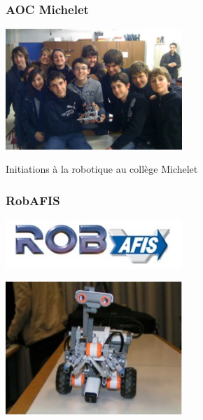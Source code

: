 \documentclass[9pt]{beamer}
\begin{document}
\begin{frame}
	\frametitle{AOC Michelet}
	
	\begin{center}
		\includegraphics[width=0.5\textwidth]{michelet}
		
		Initiations à la robotique au collège Michelet

	\end{center}
	
\end{frame}


\begin{frame}
	\frametitle{RobAFIS}
	
	\begin{center}
		\includegraphics[width=0.5\textwidth]{logo_robafis}
		
		\includegraphics[width=0.5\textwidth]{robafis}
	\end{center}

\end{frame}
\end{document}
